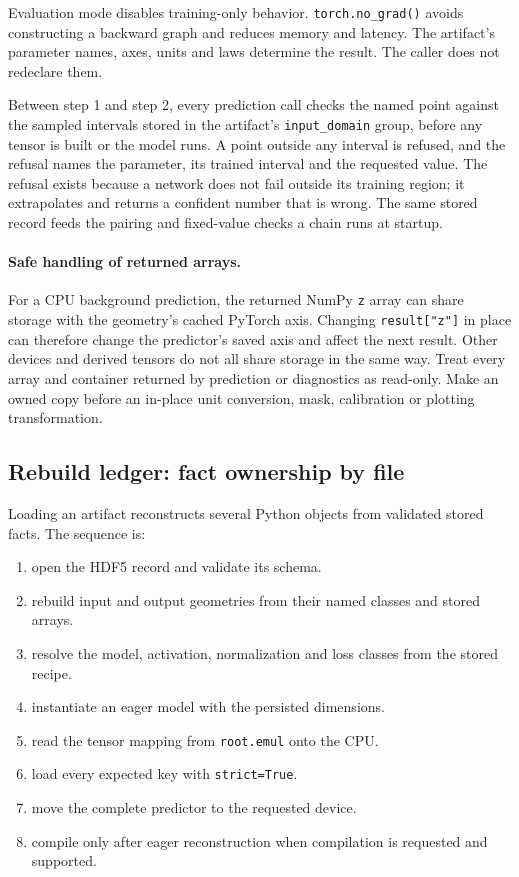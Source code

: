 \documentclass[10pt,aps,prd,twocolumn,nofootinbib]{revtex4-2}
\newcommand{\code}[1]{\texttt{#1}}
\begin{document}
Evaluation mode disables training-only behavior.  \code{torch.no\_grad()}
avoids constructing a backward graph and reduces memory and latency.  The
artifact's parameter names, axes, units and laws determine the result.  The
caller does not redeclare them.

Between step 1 and step 2, every prediction call checks the named point
against the sampled intervals stored in the artifact's \code{input\_domain}
group, before any tensor is built or the model runs.  A point outside any
interval is refused, and the refusal names the parameter, its trained
interval and the requested value.  The refusal exists because a network does
not fail outside its training region; it extrapolates and returns a
confident number that is wrong.  The same stored record feeds the pairing
and fixed-value checks a chain runs at startup.

\paragraph{Safe handling of returned arrays.}
For a CPU background prediction, the returned NumPy \code{z} array can share
storage with the geometry's cached PyTorch axis.  Changing
\code{result["z"]} in place can therefore change the predictor's saved axis
and affect the next result.  Other devices and derived tensors do not all share
storage in the same way.  Treat every array and container returned by
prediction or diagnostics as read-only.  Make an owned copy before an in-place
unit conversion, mask, calibration or plotting transformation.

\subsection{Rebuild ledger: fact ownership by file}

Loading an artifact reconstructs several Python objects from validated stored
facts.  The sequence is:
\begin{enumerate}
  \item open the HDF5 record and validate its schema.
  \item rebuild input and output geometries from their named classes and
        stored arrays.
  \item resolve the model, activation, normalization and loss classes from
        the stored recipe.
  \item instantiate an eager model with the persisted dimensions.
  \item read the tensor mapping from \code{root.emul} onto the CPU.
  \item load every expected key with \code{strict=True}.
  \item move the complete predictor to the requested device.
  \item compile only after eager reconstruction when compilation is requested
        and supported.
\end{enumerate}
\end{document}
